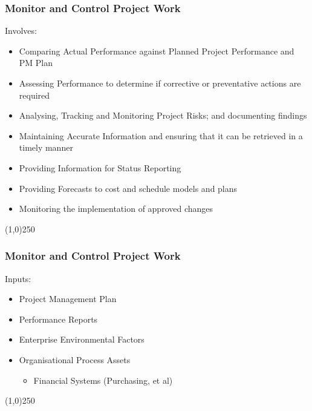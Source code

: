 \begin{frame}
\frametitle{Monitor and Control Project Work}
Involves:
\begin{itemize}
	\item Comparing Actual Performance against Planned Project Performance and PM Plan
	\item Assessing Performance to determine if corrective or preventative actions are required
	\item Analysing, Tracking and Monitoring Project Risks; and documenting findings
	\item Maintaining Accurate Information and ensuring that it can be retrieved in a timely manner
	\item Providing Information for Status Reporting
	\item Providing Forecasts to cost and schedule models and plans
	\item Monitoring the implementation of approved changes
\end{itemize}
\end{frame}\begin{center}\line(1,0){250}\end{center}
%
%
\begin{frame}
\frametitle{Monitor and Control Project Work}
Inputs:
\begin{itemize}
	\item Project Management Plan
	\item Performance Reports
	\item Enterprise Environmental Factors
	\item Organisational Process Assets
	\begin{itemize}
		\item Financial Systems (Purchasing, et al)
	\end{itemize}
\end{itemize}
\end{frame}\begin{center}\line(1,0){250}\end{center}
%
%

